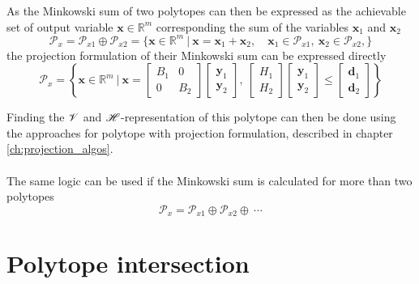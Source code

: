 As the Minkowski sum of two polytopes can then be expressed as the achievable set of output variable $\bm{x}\in\mathbb{R}^m$ corresponding the sum of the variables $\bm{x}_1$ and $\bm{x}_2$
\begin{equation}
    \mathcal{P}_{x}= \mathcal{P}_{x1} \oplus \mathcal{P}_{x2} = \{\bm{x}\in\mathbb{R}^m ~|~ \bm{x} =  \bm{x}_1 + \bm{x}_2, \quad \bm{x}_1 \in \mathcal{P}_{x1}, ~\bm{x}_2 \in \mathcal{P}_{x2},  \}
\end{equation}
the projection formulation of their Minkowski sum can be expressed directly
\begin{equation}
    \mathcal{P}_{x}=\left\{\bm{x}\in\mathbb{R}^m ~\bigg|~ 
    \bm{x} = \begin{bmatrix}
        B_1 & 0 \\
        0 & B_2
    \end{bmatrix}\begin{bmatrix}
        \bm{y}_1 \\
        \bm{y}_2
    \end{bmatrix}, ~\begin{bmatrix}
        H_1  \\
        H_2
    \end{bmatrix} \begin{bmatrix}
        \bm{y}_1 \\
        \bm{y}_2
    \end{bmatrix} \leq \begin{bmatrix}
        \bm{d}_1  \\
        \bm{d}_2
    \end{bmatrix} \right\}
\end{equation}

Finding the $\mathscr{V}$ and $\mathscr{H}$-representation of this polytope can then be done using the approaches  for polytope with projection formulation, described in chapter \ref{ch:projection_algos}.

\paragraph*{} The same logic can be used if the Minkowski sum is calculated for more than two polytopes 
\begin{equation}
    \mathcal{P}_x = \mathcal{P}_{x1} \oplus \mathcal{P}_{x2} \oplus ~\cdots
\end{equation}

\section{Polytope intersection}

